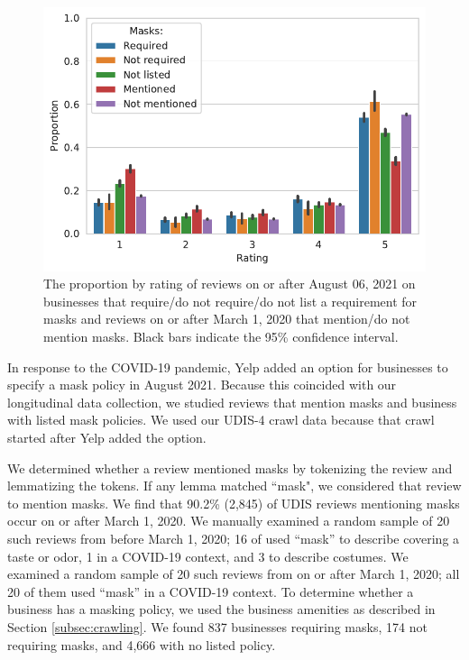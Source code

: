 \begin{figure}[t]
    \centering
    \includegraphics[width=0.9\columnwidth]{figures/proprotion_Masks_by_Rating_usa.pdf}
    \caption{The proportion by rating of reviews on or after August 06, 2021 on businesses that require/do not require/do not list a requirement for masks and reviews on or after March 1, 2020 that mention/do not mention masks. Black bars indicate the 95\% confidence interval.
    }
    \label{fig:proprotion_Masks mentions_masks required_by_rating_usa}
\end{figure}

In response to the COVID-19 pandemic, Yelp added an option for businesses to specify a mask policy in August 2021. Because this coincided with our longitudinal data collection, we studied reviews that mention masks and business with listed mask policies. We used our UDIS-4 crawl data because that crawl started after Yelp added the option. 

We determined whether a review mentioned masks by tokenizing the review and lemmatizing the tokens. If any lemma matched ``mask", we considered that review to mention masks. We find that 90.2\% (2,845) of UDIS reviews mentioning masks occur on or after March 1, 2020. We manually examined a random sample of 20 such reviews from before March 1, 2020; 16 of used ``mask'' to describe covering a taste or odor, 1 in a COVID-19 context, and 3 to describe costumes. We examined a random sample of 20 such reviews from on or after March 1, 2020; all 20 of them used ``mask'' in a COVID-19 context. To determine whether a business has a masking policy, we used the business amenities as described in Section \ref{subsec:crawling}. We found 837 businesses requiring masks, 174 not requiring masks, and 4,666 with no listed policy.

